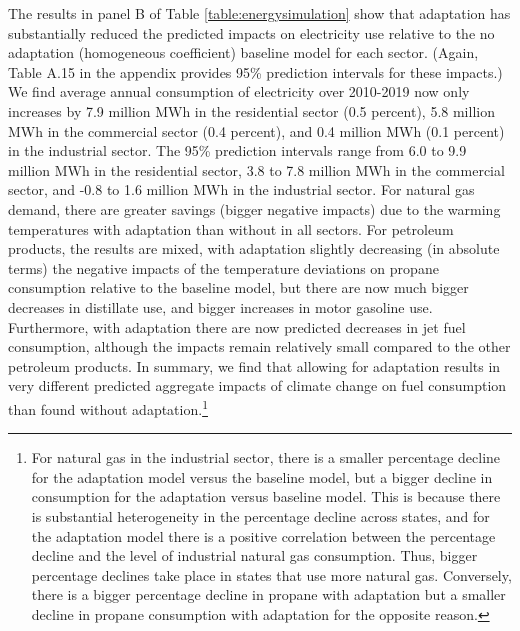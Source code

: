 \documentclass[11pt]{article}
\begin{document}
The results in panel B of Table \ref{table:energysimulation} show that adaptation has substantially reduced the predicted impacts on electricity use relative to the no adaptation (homogeneous coefficient) baseline model for each sector. (Again, Table A.15 in the appendix provides 95\% prediction intervals for these impacts.) We find average annual consumption of electricity over 2010-2019 now only increases by 7.9 million MWh in the residential sector (0.5 percent), 5.8 million MWh in the commercial sector (0.4 percent), and 0.4 million MWh (0.1 percent) in the industrial sector. The 95\% prediction intervals range from 6.0 to 9.9 million MWh in the residential sector, 3.8 to 7.8 million MWh in the commercial sector, and -0.8 to 1.6 million MWh in the industrial sector. For natural gas demand, there are greater savings (bigger negative impacts) due to the warming temperatures with adaptation than without in all sectors. For petroleum products, the results are mixed, with adaptation slightly decreasing (in absolute terms) the negative impacts of the temperature deviations on propane consumption relative to the baseline model, but there are now much bigger decreases in distillate use, and bigger increases in motor gasoline use. Furthermore, with adaptation there are now predicted decreases in jet fuel consumption, although the impacts remain relatively small compared to the other petroleum products. In summary, we find that allowing for adaptation results in very different predicted aggregate impacts of climate change on fuel consumption than found without adaptation.\footnote{ For natural gas in the industrial sector, there is a smaller percentage decline for the adaptation model versus the baseline model, but a bigger decline in consumption for the adaptation versus baseline model. This is because there is substantial heterogeneity in the percentage decline across states, and for the adaptation model there is a positive correlation between the percentage decline and the level of industrial natural gas consumption. Thus, bigger percentage declines take place in states that use more natural gas. Conversely, there is a bigger percentage decline in propane with adaptation but a smaller decline in propane consumption with adaptation for the opposite reason.} 
\end{document}
